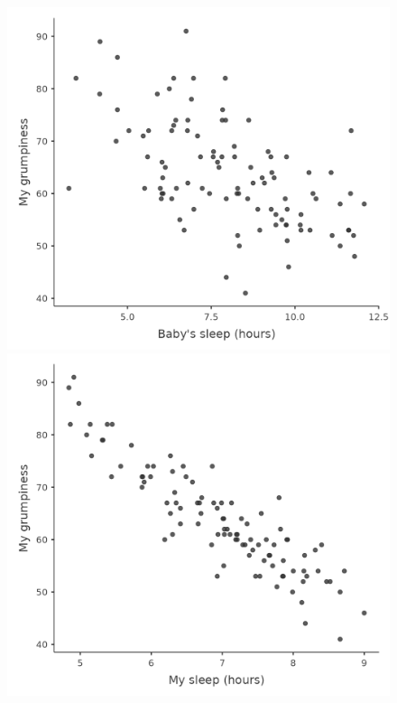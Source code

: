 \documentclass[
  a4paper,
]{book}
\begin{document}
\begin{figure}

\begin{minipage}[b]{0.50\linewidth}

{\centering 

\includegraphics{images/fig12-2a.png}

}

\subcaption{\label{fig-fig12-2a}}
\end{minipage}%
%
\begin{minipage}[b]{0.50\linewidth}

{\centering 

\includegraphics{images/fig12-2b.png}

}
\end{minipage}
\end{figure}
\end{document}
